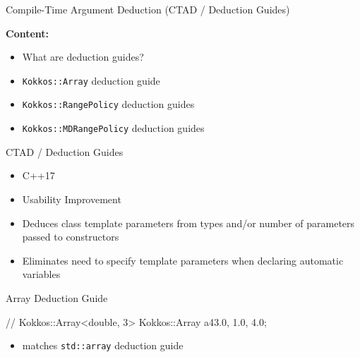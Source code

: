 

\begin{frame}[fragile]

  {\Huge Compile-Time Argument Deduction (CTAD / Deduction Guides)}
  
    \vspace{10pt}

  \textbf{Content:}
    \begin{itemize}
        \item What are deduction guides?
        \item \texttt{Kokkos::Array} deduction guide
        \item \texttt{Kokkos::RangePolicy} deduction guides
        \item \texttt{Kokkos::MDRangePolicy} deduction guides
    \end{itemize}


\end{frame}


\begin{frame}[fragile]{CTAD / Deduction Guides}

\begin{itemize}
\item C++17
\item Usability Improvement
\item Deduces class template parameters from types and/or number of parameters passed to constructors
\item Eliminates need to specify template parameters when declaring automatic variables
\end{itemize}

\end{frame}


\begin{frame}[fragile]{Array Deduction Guide}

\begin{code}[keywords={Array}]
// Kokkos::Array<double, 3>
Kokkos::Array a4{3.0, 1.0, 4.0};	
\end{code}

\begin{itemize}
\item matches \texttt{std::array} deduction guide
\end{itemize}

\end{frame}

